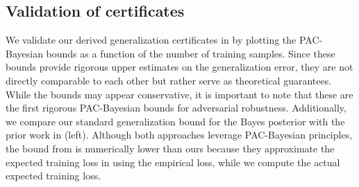 \subsection{Validation of certificates} 
We validate our derived generalization certificates in  by plotting the PAC-Bayesian bounds as a function of the number of training samples. Since these bounds provide rigorous upper estimates on the generalization error, they are not directly comparable to each other but rather serve as theoretical guarantees. While the bounds may appear conservative, it is important to note that these are the first rigorous PAC-Bayesian bounds for adversarial robustness.
Additionally, we compare our standard generalization bound for the Bayes posterior with the prior work \citep{germain2016pac} in  (left). Although both approaches leverage PAC-Bayesian principles, the bound from \citep{germain2016pac} is numerically lower than ours because they approximate the expected training loss in   using the empirical loss, while we compute the actual expected training loss. 

\begin{comment}
\begin{figure}[h]
    \centering
    \vspace{-0.5cm}
    \texttt{[image: figures/germain\_d5\_nsplit10\_0.3.pdf]}
    \caption{Comparison to \citep{germain2016pac}
    \label{fig:comp_germain}}
\end{figure}
\end{comment}